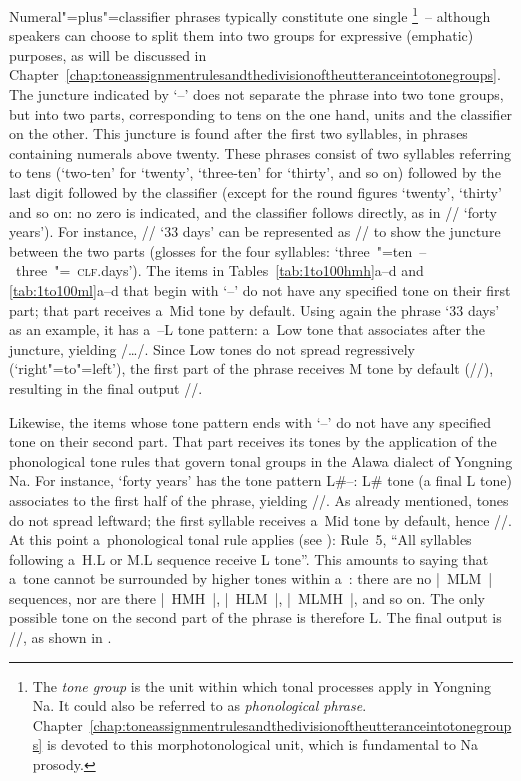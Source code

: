 Numeral"=plus"=classifier phrases typically constitute one single \footnote{The \textit{tone group} is the unit within which tonal processes apply in Yongning Na. It could also be referred to as \textit{phonological phrase}. Chapter~\ref{chap:toneassignmentrulesandthedivisionoftheutteranceintotonegroups} is devoted to this morphotonological unit, which is fundamental to Na {prosody}.}~-- although
speakers can choose to split them into two groups for expressive (emphatic) purposes, as will be
discussed in Chapter~\ref{chap:toneassignmentrulesandthedivisionoftheutteranceintotonegroups}. The juncture indicated by ‘--’ does
not separate the phrase into two tone groups, but into two parts, corresponding to tens on the one hand, units and the classifier on the other. This juncture is found after the first two syllables, in phrases containing numerals above twenty. These phrases consist of two syllables referring to tens (‘two-ten’ for ‘twenty’, ‘three-ten’ for ‘thirty’, and so on) followed by the last digit followed by the classifier (except for the round figures ‘twenty’, ‘thirty’ and so on: no zero is indicated, and the classifier follows directly, as in // ‘forty years’). For instance, // ‘33 days’ can be represented as // to show the juncture between the two parts (glosses for the four syllables: ‘three~"=ten~--~three~"=~\textsc{clf}.days’). The items in Tables~\ref{tab:1to100hmh}a--d and \ref{tab:1to100ml}a--d that begin with ‘--’ do not have any specified tone on their first part; that
part receives a~Mid tone by default. Using again the phrase ‘33 days’ as an example, it has a~--L tone pattern: a~Low tone
that associates after the juncture, yielding /{\dots}/. Since Low tones do not spread
regressively (‘right"=to"=left’), the first part of the phrase receives M tone by default (//),
resulting in the final output //.

Likewise, the items whose tone pattern ends with ‘--’ do not have any specified tone on their second part. That
part receives its tones by the application of the phonological tone rules that govern tonal groups in
the Alawa dialect of Yongning Na. For instance, ‘forty years’ has the tone pattern L\#--: L\# tone (a final L tone)
associates to the first half of the phrase, yielding //. As already mentioned, tones do not spread leftward; the first syllable
receives a~Mid tone by default, hence //. At this point a~phonological tonal rule applies (see ):
Rule~5, “All syllables following a~H.L or M.L sequence receive L tone”. This amounts to saying that
a~tone cannot be surrounded by higher tones within a~: there are no |~MLM~|
sequences, nor are there |~HMH~|, |~HLM~|, |~MLMH~|, and so on. The only possible tone on the second
part of the phrase is therefore L. The final output is //, as shown in .

